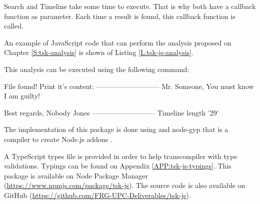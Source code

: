 Search and Timeline take some time to execute. That is why both have a callback
function as parameter. Each time a result is found, this callback function is
called.

An example of JavaScript code that can perform the analysis proposed on 
Chapter \ref{S:tsk-analysis} is shown of Listing \ref{L:tsk-js-analysis}.

\begin{codefigure}
\end{codefigure}

This analysis can be executed using the following command:

\begin{terminal}[caption=Execute The Sleuth Kit JavaScript analysis
,label=L:tsk-js-execute-analysis]
%
%
File found!
Print it's content:
---------------------------
Mr. Someone,
You must know I am guilty!

Best regards,
Nobody Jones
---------------------------
Timeline length '29'

\end{terminal}

The implementation of this package is done using \CC and node-gyp that is a 
compiler to create Node.js addons \cite{node-gyp-github}.

A TypeScript types file is provided in order to help transcompiler with type 
validations. Typings can be found on Appendix \ref{APP:tsk-js-typings}.
This package is available on Node Package Manager
(\url{https://www.npmjs.com/package/tsk-js}). The source code is also available
on GitHub (\url{https://github.com/FRG-UPC-Deliverables/tsk-js}).

